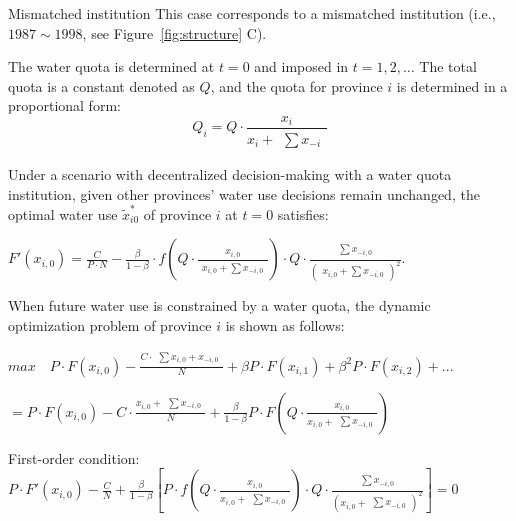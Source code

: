 \documentclass{../nsr}
\begin{document}
\begin{case} Mismatched institution
    This case corresponds to a mismatched institution (i.e., $1987\sim1998$, see Figure~\ref{fig:structure} C).

    The water quota is determined at $t=0$ and imposed in $t=1,2,\ldots$ The total quota is a constant denoted as $Q$, and the quota for province $i$ is determined in a proportional form:
    $$Q_i=Q \cdot \frac{x_i}{x_i + \begin{matrix} \sum x_{-i} \end{matrix}}$$

    Under a scenario with decentralized decision-making with a water quota institution, given other provinces’ water use decisions remain unchanged, the optimal water use $\widetilde x_{i0}^*$ of province $i$ at $t=0$ satisfies:

    $F'(x_{i,0})=\frac{C}{P \cdot N} - \frac{\beta}{1-\beta} \cdot f(Q \cdot \frac{x_{i,0}}{\begin{matrix} x_{i,0} + \sum x_{-i,0} \end{matrix}}) \cdot Q \cdot \frac{\begin{matrix} \sum x_{-i,0} \end{matrix}}{(\begin{matrix} x_{i,0} + \sum x_{-i,0} \end{matrix})^2}$.

    When future water use is constrained by a water quota, the dynamic optimization problem of province $i$ is shown as follows:

    $max  \quad P \cdot F(x_{i,0})-\frac{C \cdot \begin{matrix} \sum x_{i,0} + x_{-i,0} \end{matrix}}{N}+\beta P \cdot F(x_{i,1})+\beta^2 P \cdot F(x_{i,2})+...$

    $=P \cdot F(x_{i,0})-C \cdot \frac{x_{i,0} + \begin{matrix} \sum x_{-i,0} \end{matrix}}{N}+\frac{\beta}{1-\beta} P \cdot F(Q \cdot \frac{x_{i,0}}{x_{i,0} + \begin{matrix} \sum x_{-i,0} \end{matrix}})$

    First-order condition: $P \cdot F'(x_{i,0})-\frac{C}{N}+\frac{\beta}{1-\beta}[P \cdot f(Q \cdot \frac{x_{i,0}}{x_{i,0} + \begin{matrix} \sum x_{-i,0} \end{matrix}}) \cdot Q \cdot \frac{\begin{matrix} \sum x_{-i,0} \end{matrix}}{(x_{i,0}+\begin{matrix} \sum  x_{-i,0} \end{matrix})^2}]=0$


\end{case}
\end{document}
